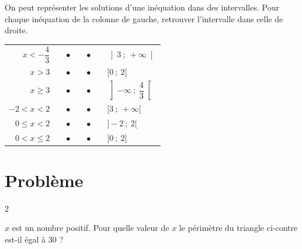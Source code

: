 \documentclass[10pt,a4paper]{article}
\begin{document}
\begin{exo}[][]

On peut représenter les solutions d'une inéquation dans des intervalles. Pour chaque inéquation de la colonne de gauche, retrouver l'intervalle dans celle de droite.

\renewcommand{\arraystretch}{2}
\begin{tabular}{rp{0.1cm}cp{2cm}cp{0.1cm}l}
    \(x<-\dfrac{4}{3}\) &  & \(\bullet\) &  & \(\bullet\) & & \(\left]3\ ;\ +\infty\right[\) \\    
    \(x>3\) &  & \(\bullet\) &  & \(\bullet\) & & \([0\ ;\ 2[\) \\
    \(x\geq 3\) &  & \(\bullet\) &  & \(\bullet\) & & \(\left]-\infty\ ;\ \dfrac{4}{3}\right[\) \\
    \(-2< x <2\) &  & \(\bullet\) &  & \(\bullet\) & & \([3\ ;\ +\infty[\) \\
    \(0\leq x < 2\) &  & \(\bullet\) &  & \(\bullet\) & & \(]-2\ ;\ 2[\) \\

    \(0< x \leq 2\) &  & \(\bullet\) &  & \(\bullet\) & & \(]0\ ;\ 2]\) \\
\end{tabular}

\end{exo}



\newpage

\section{Problème}

\begin{multicols}{2}
    \begin{minipage}{0.45\textwidth}
     \begin{exo}[][]

    $x$ est un nombre positif. Pour quelle valeur de $x$ le périmètre du triangle ci-contre est-il égal à 30 ?
\end{exo}   
    \end{minipage}

\end{multicols}
\end{document}
